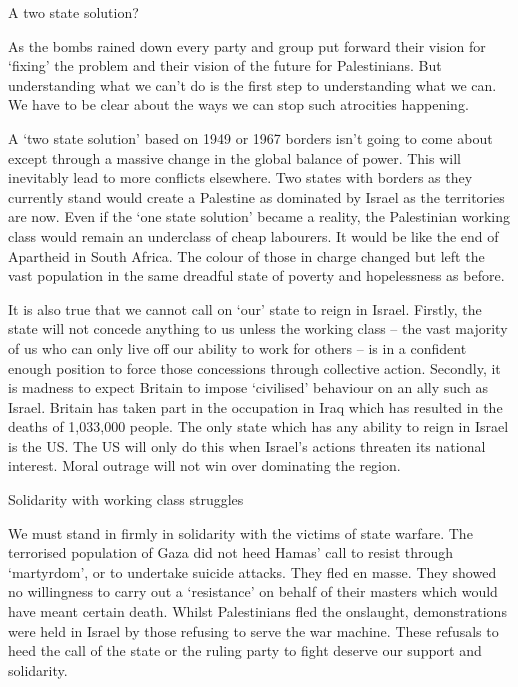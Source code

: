 A two state solution?

As the bombs rained down every party and group put forward their vision for ‘fixing’
the problem and their vision of the future for Palestinians.
But understanding what we
can’t do is the first step to understanding what we can.
We have to be clear about the
ways we can stop such atrocities happening.

A ‘two state solution’ based on 1949 or 1967 borders isn’t going to come about except
through a massive change in the global balance of power.
This will inevitably lead to
more conflicts elsewhere.
Two states with borders as they currently stand would create a
Palestine as dominated by Israel as the territories are now.
Even if the ‘one state solution’
became a reality, the Palestinian working class would remain an underclass of cheap
labourers.
It would be like the end of Apartheid in South Africa.
The colour of those in
charge changed but left the vast population in the same dreadful state of poverty and
hopelessness as before.

It is also true that we cannot call on ‘our’ state to reign in Israel.
Firstly, the state will
not concede anything to us unless the working class – the vast majority of us who can
only live off our ability to work for others – is in a confident enough position to force
those concessions through collective action.
Secondly, it is madness to expect Britain to
impose ‘civilised’ behaviour on an ally such as Israel.
Britain has taken part in the occupation in Iraq which has resulted in the deaths of 1,033,000 people.
The only state which
has any ability to reign in Israel is the US.
The US will only do this when Israel’s actions
threaten its national interest.
Moral outrage will not win over dominating the region.

Solidarity with working class struggles

We must stand in firmly in solidarity with the victims of state warfare.
The terrorised
population of Gaza did not heed Hamas’ call to resist through ‘martyrdom’, or to
undertake suicide attacks.
They fled en masse.
They showed no willingness to carry out
a ‘resistance’ on behalf of their masters which would have meant certain death.
Whilst
Palestinians fled the onslaught, demonstrations were held in Israel by those refusing to
serve the war machine.
These refusals to heed the call of the state or the ruling party to
fight deserve our support and solidarity.

